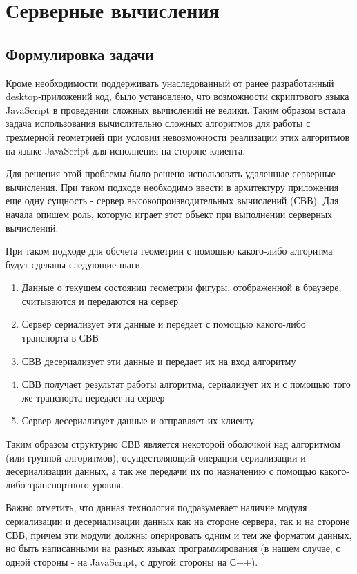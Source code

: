 \section{Серверные вычисления}

\subsection{Формулировка задачи}

Кроме необходимости поддерживать унаследованный от ранее разработанный
desktop-приложений код, было установлено, что возможности скриптового языка
JavaScript в проведении сложных вычислений не велики. Таким образом встала
задача использования вычислительно сложных алгоритмов для работы с трехмерной
геометрией при условии невозможности реализации этих алгоритмов на языке
JavaScript для исполнения на стороне клиента.

Для решения этой проблемы было решено использовать удаленные серверные
вычисления. При таком подходе необходимо ввести в архитектуру приложения еще
одну сущность - сервер высокопроизводительных вычислений (СВВ). Для начала
опишем роль, которую играет этот объект при выполнении серверных вычислений.

При таком подходе для обсчета геометрии с помощью какого-либо алгоритма будут
сделаны следующие шаги.

\begin{enumerate}
    \item Данные о текущем состоянии геометрии фигуры, отображенной в браузере,
    считываются и передаются на сервер
    \item Сервер сериализует эти данные и передает с помощью какого-либо
    транспорта в СВВ
    \item СВВ десериализует эти данные и передает их на вход алгоритму
    \item СВВ получает результат работы алгоритма, сериализует их и с
    помощью того же транспорта передает на сервер
    \item Сервер десериализует данные и отправляет их клиенту
\end{enumerate}

Таким образом структурно СВВ является некоторой оболочкой над алгоритмом (или
группой алгоритмов), осуществляющий операции сериализации и десериализации
данных, а так же передачи их по назначению с помощью какого-либо транспортного
уровня.

Важно отметить, что данная технология подразумевает наличие модуля сериализации
и десериализации данных как на стороне сервера, так и на стороне СВВ, причем
эти модули должны оперировать одним и тем же форматом данных, но быть
написанными на разных языках программирования (в нашем случае, с одной стороны -
на JavaScript, с другой стороны на С++).

